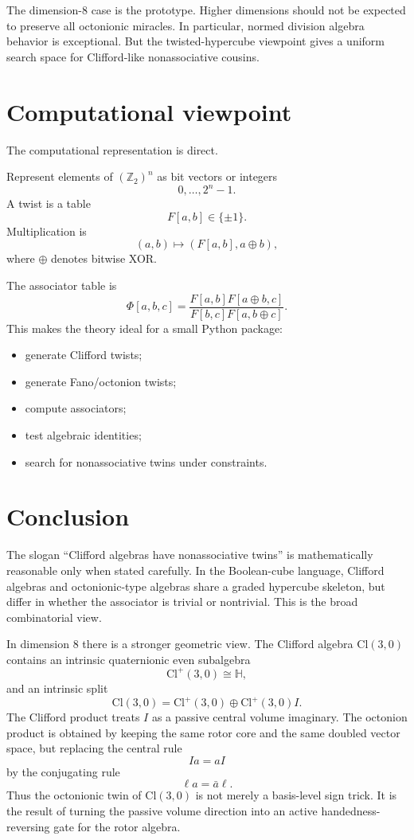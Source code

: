 \documentclass[11pt]{article}
\newcommand{\Ztwo}{\mathbb Z_2}
\newcommand{\Cl}{\mathrm{Cl}}
\newcommand{\assoc}{\Phi}
\begin{document}
The dimension-$8$ case is the prototype. Higher dimensions should not be
expected to preserve all octonionic miracles. In particular, normed division
algebra behavior is exceptional. But the twisted-hypercube viewpoint gives
a uniform search space for Clifford-like nonassociative cousins.

\section{Computational viewpoint}

The computational representation is direct.

Represent elements of $(\Ztwo)^n$ as bit vectors or integers
\[
0,\dots,2^n-1.
\]
A twist is a table
\[
F[a,b]\in\{\pm 1\}.
\]
Multiplication is
\[
(a,b)\mapsto (F[a,b],a\oplus b),
\]
where $\oplus$ denotes bitwise XOR.

The associator table is
\[
\assoc[a,b,c]
=
\frac{F[a,b]F[a\oplus b,c]}
     {F[b,c]F[a,b\oplus c]}.
\]
This makes the theory ideal for a small Python package:
\begin{itemize}
    \item generate Clifford twists;
    \item generate Fano/octonion twists;
    \item compute associators;
    \item test algebraic identities;
    \item search for nonassociative twins under constraints.
\end{itemize}


\section{Conclusion}

The slogan ``Clifford algebras have nonassociative twins'' is mathematically
reasonable only when stated carefully. In the Boolean-cube language, Clifford
algebras and octonionic-type algebras share a graded hypercube skeleton, but
differ in whether the associator is trivial or nontrivial. This is the broad
combinatorial view.

In dimension $8$ there is a stronger geometric view. The Clifford algebra
$\Cl(3,0)$ contains an intrinsic quaternionic even subalgebra
\[
\Cl^+(3,0)\cong\mathbb H,
\]
and an intrinsic split
\[
\Cl(3,0)=\Cl^+(3,0)\oplus\Cl^+(3,0)I.
\]
The Clifford product treats $I$ as a passive central volume imaginary. The
octonion product is obtained by keeping the same rotor core and the same
doubled vector space, but replacing the central rule
\[
Ia=aI
\]
by the conjugating rule
\[
\ell a=\bar a\ell.
\]
Thus the octonionic twin of $\Cl(3,0)$ is not merely a basis-level sign trick.
It is the result of turning the passive volume direction into an active
handedness-reversing gate for the rotor algebra.
\end{document}
